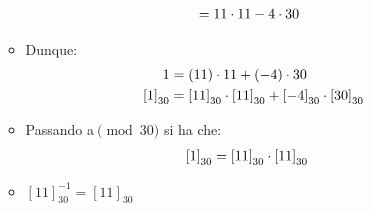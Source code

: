 \documentclass[10pt]{article}
\begin{document}
\begin{enumerate}
\begin{itemize}
\begin{equation}
\begin{split}
	&= 11 \cdot 11 - 4 \cdot 30
	\notag
	\end{split}
	\end{equation}
	\item
	Dunque:
	\begin{equation}
	\begin{split}
	1 &= (11) \cdot 11 + (-4) \cdot 30 \\
	\left[1\right]_{30} &= \left[11\right]_{30} \cdot \left[11\right]_{30} + \left[-4\right]_{30} \cdot \left[30\right]_{30}
	\notag
	\end{split}
	\end{equation}
	\item
	Passando a$\pmod{30}$ si ha che:
	\begin{equation}
	\begin{split}
	\left[1\right]_{30} &= \left[11\right]_{30} \cdot \left[11\right]_{30}
	\notag
	\end{split}
	\end{equation}
	\item
	$\left[11\right]_{30}^{-1} = \left[11\right]_{30}$
	\end{itemize}
	\end{enumerate}
	
	\newpage
\end{document}

